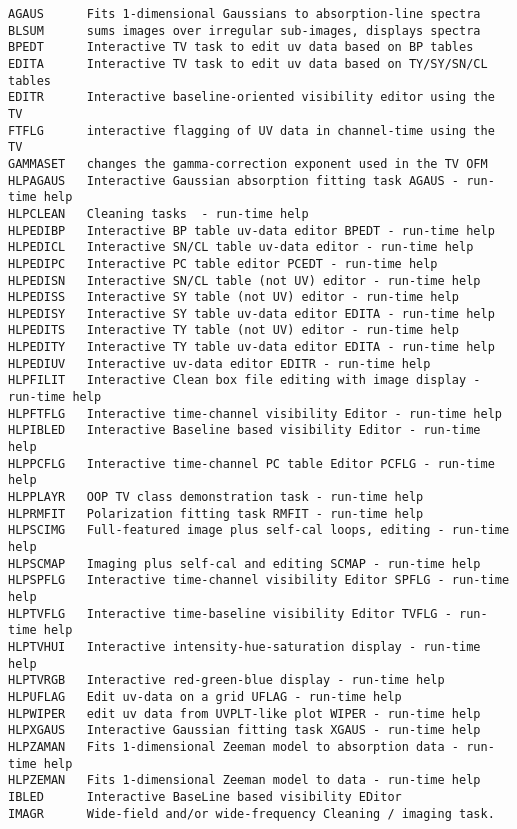 \vskip 0.5pt
\bbve\begin{verbatim}
AGAUS      Fits 1-dimensional Gaussians to absorption-line spectra
BLSUM      sums images over irregular sub-images, displays spectra
BPEDT      Interactive TV task to edit uv data based on BP tables
EDITA      Interactive TV task to edit uv data based on TY/SY/SN/CL tables
EDITR      Interactive baseline-oriented visibility editor using the TV
FTFLG      interactive flagging of UV data in channel-time using the TV
GAMMASET   changes the gamma-correction exponent used in the TV OFM
HLPAGAUS   Interactive Gaussian absorption fitting task AGAUS - run-time help
HLPCLEAN   Cleaning tasks  - run-time help
HLPEDIBP   Interactive BP table uv-data editor BPEDT - run-time help
HLPEDICL   Interactive SN/CL table uv-data editor - run-time help
HLPEDIPC   Interactive PC table editor PCEDT - run-time help
HLPEDISN   Interactive SN/CL table (not UV) editor - run-time help
HLPEDISS   Interactive SY table (not UV) editor - run-time help
HLPEDISY   Interactive SY table uv-data editor EDITA - run-time help
HLPEDITS   Interactive TY table (not UV) editor - run-time help
HLPEDITY   Interactive TY table uv-data editor EDITA - run-time help
HLPEDIUV   Interactive uv-data editor EDITR - run-time help
HLPFILIT   Interactive Clean box file editing with image display - run-time help
HLPFTFLG   Interactive time-channel visibility Editor - run-time help
HLPIBLED   Interactive Baseline based visibility Editor - run-time help
HLPPCFLG   Interactive time-channel PC table Editor PCFLG - run-time help
HLPPLAYR   OOP TV class demonstration task - run-time help
HLPRMFIT   Polarization fitting task RMFIT - run-time help
HLPSCIMG   Full-featured image plus self-cal loops, editing - run-time help
HLPSCMAP   Imaging plus self-cal and editing SCMAP - run-time help
HLPSPFLG   Interactive time-channel visibility Editor SPFLG - run-time help
HLPTVFLG   Interactive time-baseline visibility Editor TVFLG - run-time help
HLPTVHUI   Interactive intensity-hue-saturation display - run-time help
HLPTVRGB   Interactive red-green-blue display - run-time help
HLPUFLAG   Edit uv-data on a grid UFLAG - run-time help
HLPWIPER   edit uv data from UVPLT-like plot WIPER - run-time help
HLPXGAUS   Interactive Gaussian fitting task XGAUS - run-time help
HLPZAMAN   Fits 1-dimensional Zeeman model to absorption data - run-time help
HLPZEMAN   Fits 1-dimensional Zeeman model to data - run-time help
IBLED      Interactive BaseLine based visibility EDitor
IMAGR      Wide-field and/or wide-frequency Cleaning / imaging task.

\end{verbatim}
